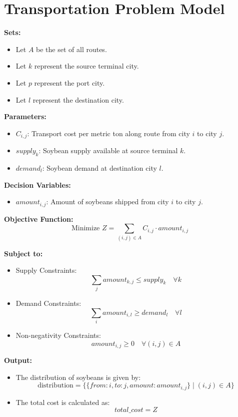 \documentclass{article}
\begin{document}
\section*{Transportation Problem Model}

\textbf{Sets:}
\begin{itemize}
    \item Let \( A \) be the set of all routes.
    \item Let \( k \) represent the source terminal city.
    \item Let \( p \) represent the port city.
    \item Let \( l \) represent the destination city.
\end{itemize}

\textbf{Parameters:}
\begin{itemize}
    \item \( C_{i,j} \): Transport cost per metric ton along route from city \( i \) to city \( j \).
    \item \( supply_k \): Soybean supply available at source terminal \( k \).
    \item \( demand_l \): Soybean demand at destination city \( l \).
\end{itemize}

\textbf{Decision Variables:}
\begin{itemize}
    \item \( amount_{i,j} \): Amount of soybeans shipped from city \( i \) to city \( j \).
\end{itemize}

\textbf{Objective Function:}
\[
\text{Minimize } Z = \sum_{(i,j) \in A} C_{i,j} \cdot amount_{i,j}
\]

\textbf{Subject to:}
\begin{itemize}
    \item Supply Constraints:
    \[
    \sum_{j} amount_{k,j} \leq supply_k \quad \forall k
    \]
    
    \item Demand Constraints:
    \[
    \sum_{i} amount_{i,l} \geq demand_l \quad \forall l
    \]
    
    \item Non-negativity Constraints:
    \[
    amount_{i,j} \geq 0 \quad \forall (i,j) \in A
    \]
\end{itemize}

\textbf{Output:}
\begin{itemize}
    \item The distribution of soybeans is given by:
    \[
    \text{distribution} = \{ \{from: i, to: j, amount: amount_{i,j}\} \mid (i,j) \in A \}
    \]
    
    \item The total cost is calculated as:
    \[
    total\_cost = Z
    \]
\end{itemize}
\end{document}
